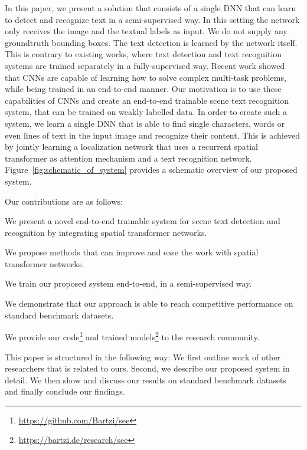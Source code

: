 \documentclass[letterpaper]{article}
\begin{document}
	In this paper, we present a solution that consists of a single \ac{DNN} that can learn to detect and recognize text in a semi-supervised way.
	In this setting the network only receives the image and the textual labels as input.
	We do not supply any groundtruth bounding boxes.
	The text detection is learned by the network itself.
	This is contrary to existing works, where text detection and text recognition systems are trained separately in a fully-supervised way.
	Recent work \cite{Dai2016InstanceAware} showed that \acp{CNN} are capable of learning how to solve complex multi-task problems, while being trained in an end-to-end manner.
	Our motivation is to use these capabilities of \acp{CNN} and create an end-to-end trainable scene text recognition system, that can be trained on weakly labelled data.
	In order to create such a system, we learn a single \ac{DNN} that is able to find single characters, words or even lines of text in the input image and recognize their content.
	This is achieved by jointly learning a localization network that uses a recurrent spatial transformer \cite{Jaderberg2015Spatial,Snderby2015Recurrent} as attention mechanism and a text recognition network.
	Figure~\ref{fig:schematic_of_system} provides a schematic overview of our proposed system.

	Our contributions are as follows:
	\begin{enumerate*}[label={(\arabic*)}]
		\item We present a novel end-to-end trainable system for scene text detection and recognition by integrating spatial transformer networks.
		\item We propose methods that can improve and ease the work with spatial transformer networks.
		\item We train our proposed system end-to-end, in a semi-supervised way.
		\item We demonstrate that our approach is able to reach competitive performance on standard benchmark datasets.
		\item We provide our code\footnote{\url{https://github.com/Bartzi/see}} and trained models\footnote{\url{https://bartzi.de/research/see}} to the research community.
	\end{enumerate*}

	This paper is structured in the following way:
	We first outline work of other researchers that is related to ours.
	Second, we describe our proposed system in detail.
	We then show and discuss our results on standard benchmark datasets and finally conclude our findings.
\end{document}

